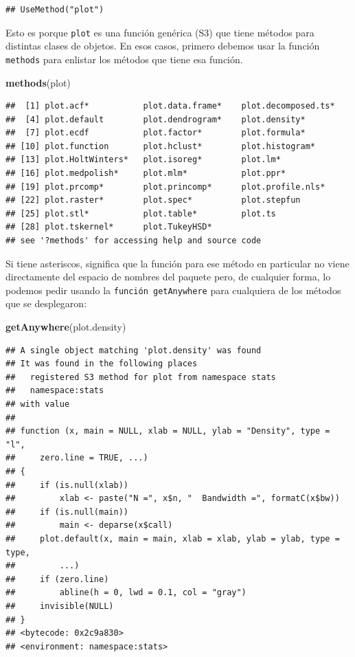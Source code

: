 \documentclass[]{article}
\newenvironment{Shaded}{\begin{snugshade}}{\end{snugshade}}
\newcommand{\KeywordTok}[1]{\textcolor[rgb]{0.13,0.29,0.53}{\textbf{#1}}}
\newcommand{\NormalTok}[1]{#1}
\begin{document}
\begin{verbatim}
## UseMethod("plot")
\end{verbatim}

Esto es porque \texttt{plot} es una función genérica (S3) que tiene
métodos para distintas clases de objetos. En esos casos, primero debemos
usar la función \texttt{methods} para enlistar los métodos que tiene esa
función.

\begin{Shaded}
\begin{Highlighting}[]
\KeywordTok{methods}\NormalTok{(plot)}
\end{Highlighting}
\end{Shaded}

\begin{verbatim}
##  [1] plot.acf*           plot.data.frame*    plot.decomposed.ts*
##  [4] plot.default        plot.dendrogram*    plot.density*      
##  [7] plot.ecdf           plot.factor*        plot.formula*      
## [10] plot.function       plot.hclust*        plot.histogram*    
## [13] plot.HoltWinters*   plot.isoreg*        plot.lm*           
## [16] plot.medpolish*     plot.mlm*           plot.ppr*          
## [19] plot.prcomp*        plot.princomp*      plot.profile.nls*  
## [22] plot.raster*        plot.spec*          plot.stepfun       
## [25] plot.stl*           plot.table*         plot.ts            
## [28] plot.tskernel*      plot.TukeyHSD*     
## see '?methods' for accessing help and source code
\end{verbatim}

Si tiene asteriscos, significa que la función para ese método en
particular no viene directamente del espacio de nombres del paquete
pero, de cualquier forma, lo podemos pedir usando la
\texttt{función\ getAnywhere} para cualquiera de los métodos que se
desplegaron:

\begin{Shaded}
\begin{Highlighting}[]
\KeywordTok{getAnywhere}\NormalTok{(plot.density)}
\end{Highlighting}
\end{Shaded}

\begin{verbatim}
## A single object matching 'plot.density' was found
## It was found in the following places
##   registered S3 method for plot from namespace stats
##   namespace:stats
## with value
## 
## function (x, main = NULL, xlab = NULL, ylab = "Density", type = "l", 
##     zero.line = TRUE, ...) 
## {
##     if (is.null(xlab)) 
##         xlab <- paste("N =", x$n, "  Bandwidth =", formatC(x$bw))
##     if (is.null(main)) 
##         main <- deparse(x$call)
##     plot.default(x, main = main, xlab = xlab, ylab = ylab, type = type, 
##         ...)
##     if (zero.line) 
##         abline(h = 0, lwd = 0.1, col = "gray")
##     invisible(NULL)
## }
## <bytecode: 0x2c9a830>
## <environment: namespace:stats>
\end{verbatim}
\end{document}
